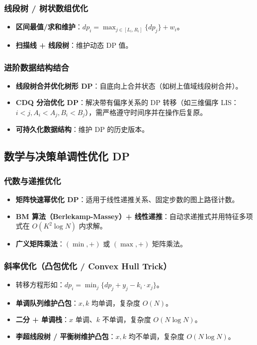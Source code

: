 \subsubsection{线段树 / 树状数组优化}
\begin{itemize}
    \item \textbf{区间最值/求和维护}：$dp_i = \max_{j \in [L_i, R_i]} \{dp_j\} + w_i$。
    \item \textbf{扫描线 + 线段树}：维护动态 DP 值。
\end{itemize}

\subsubsection{进阶数据结构结合}
\begin{itemize}
    \item \textbf{线段树合并优化树形 DP}：自底向上合并状态（如树上值域线段树合并）。
    \item \textbf{CDQ 分治优化 DP}：解决带有偏序关系的 DP 转移（如三维偏序 LIS：$i < j, A_i < A_j, B_i < B_j$），需严格遵守时间序并在操作后复原。
    \item \textbf{可持久化数据结构}：维护 DP 的历史版本。
\end{itemize}


\subsection{数学与决策单调性优化 DP}

\subsubsection{代数与递推优化}
\begin{itemize}
    \item \textbf{矩阵快速幂优化 DP}：适用于线性递推关系、固定步数的图上路径计数。
    \item \textbf{BM 算法（Berlekamp-Massey）+ 线性递推}：自动求递推式并用特征多项式在 $O(K^2 \log N)$ 内求解。
    \item \textbf{广义矩阵乘法}：$(\min, +)$ 或 $(\max, +)$ 矩阵乘法。
\end{itemize}

\subsubsection{斜率优化（凸包优化 / Convex Hull Trick）}
\begin{itemize}
    \item 转移方程形如：$dp_i = \min_j \{dp_j + y_j - k_i \cdot x_j\}$。
    \item \textbf{单调队列维护凸包}：$x, k$ 均单调，复杂度 $O(N)$。
    \item \textbf{二分 + 单调栈}：$x$ 单调、$k$ 不单调，复杂度 $O(N \log N)$。
    \item \textbf{李超线段树 / 平衡树维护凸包}：$x, k$ 均不单调，复杂度 $O(N \log N)$。
\end{itemize}

